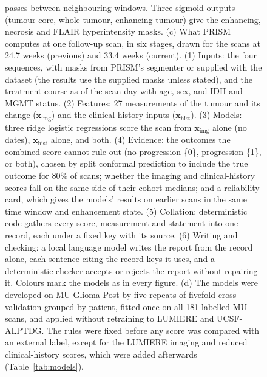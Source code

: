 \begin{figure}[!htbp]
{passes between neighbouring windows. Three sigmoid outputs (tumour core, whole tumour, enhancing tumour) give the
enhancing, necrosis and FLAIR hyperintensity masks. (c) What PRISM computes at one follow-up scan, in six stages,
drawn for the scans at 24.7 weeks (previous) and 33.4 weeks (current). (1) Inputs: the four sequences, with masks from
PRISM's segmenter or supplied with the dataset (the results use the supplied masks unless stated), and the treatment
course as of the scan day with age, sex, and IDH and MGMT status. (2) Features: 27 measurements of the tumour and its
change ($\mathbf{x}_{\mathrm{img}}$) and the clinical-history inputs ($\mathbf{x}_{\mathrm{hist}}$). (3) Models: three
ridge logistic regressions score the scan from $\mathbf{x}_{\mathrm{img}}$ alone (no dates),
$\mathbf{x}_{\mathrm{hist}}$ alone, and both. (4) Evidence: the outcomes the combined score cannot rule out (no
progression \{0\}, progression \{1\}, or both), chosen by split conformal prediction to include the true outcome for
80\% of scans; whether the imaging and clinical-history scores fall on the same side of their cohort medians; and a
reliability card, which gives the models' results on earlier scans in the same time window and enhancement state. (5)
Collation: deterministic code gathers every score, measurement and statement into one record, each under a fixed key
with its source. (6) Writing and checking: a local language model writes the report from the record alone, each
sentence citing the record keys it uses, and a deterministic checker accepts or rejects the report without repairing
it. Colours mark the models as in every figure. (d) The models were developed on MU-Glioma-Post by five repeats of
fivefold cross validation grouped by patient, fitted once on all 181 labelled MU scans, and applied without retraining
to LUMIERE and UCSF-ALPTDG. The rules were fixed before any score was compared with an external label, except for the
LUMIERE imaging and reduced clinical-history scores, which were added afterwards (Table~\ref{tab:models}).}
\label{fig:1}
\end{figure}

